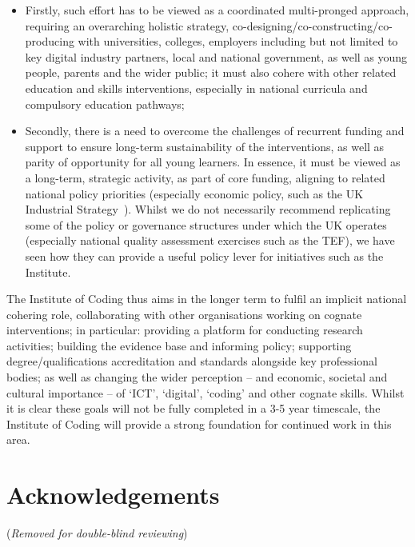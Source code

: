 \documentclass[conference]{IEEEtran}
\begin{document}
\begin{itemize}
\item Firstly, such effort has to be viewed as a coordinated
multi-pronged approach, requiring an overarching holistic strategy,
co-designing/co-constructing/co-producing with universities, colleges,
employers including but not limited to key digital industry partners,
local and national government, as well as young people, parents and
the wider public; it must also cohere with other related education and
skills interventions, especially in national curricula and compulsory
education pathways;

\item Secondly, there is a need to overcome the challenges of
recurrent funding and support to ensure long-term sustainability of
the interventions, as well as parity of opportunity for all
young learners. In essence, it must be viewed as a long-term,
strategic activity, as part of core funding, aligning to related
national policy priorities (especially economic policy, such as the UK
Industrial Strategy~\cite{ukis:2017}). Whilst we do not necessarily
recommend replicating some of the policy or governance structures
under which the UK operates (especially national quality assessment
exercises such as the TEF), we have seen how they can provide a useful
policy lever for initiatives such as the Institute.
\end{itemize}

The Institute of Coding thus aims in the longer term to fulfil an
implicit national cohering role, collaborating with other
organisations working on cognate interventions; in particular:
providing a platform for conducting research activities; building the
evidence base and informing policy; supporting degree/qualifications
accreditation and standards alongside key professional bodies; as well
as changing the wider perception -- and economic, societal and
cultural importance -- of `ICT', `digital', `coding' and other cognate
skills. Whilst it is clear these goals will not be fully completed in
a 3-5 year timescale, the Institute of Coding will provide a strong
foundation for continued work in this area.

\section*{Acknowledgements}

({\emph{Removed for double-blind reviewing}})

\end{document}
